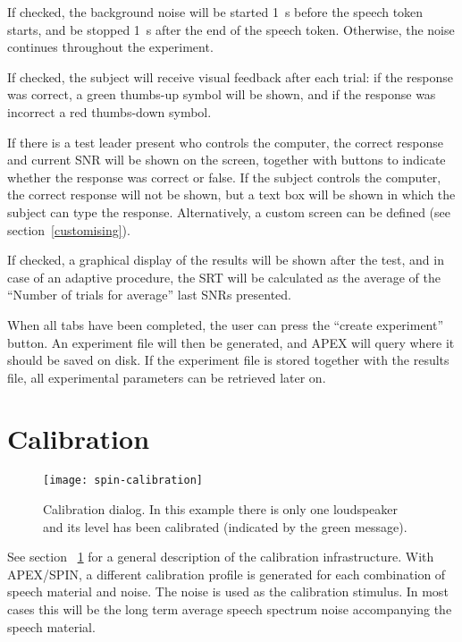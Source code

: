 \begin{description}
\itemsep1pt\parskip0pt
\item[Noise stops between trials]
If checked, the background noise will be started 1~s before the speech
token starts, and be stopped 1~s after the end of the speech token.
Otherwise, the noise continues throughout the experiment.
\item[Reinforcement]
If checked, the subject will receive visual feedback after each trial:
if the response was correct, a green thumbs-up symbol will be shown, and
if the response was incorrect a red thumbs-down symbol.
\item[Screen]
If there is a test leader present who controls the computer, the correct
response and current SNR will be shown on the screen, together with
buttons to indicate whether the response was correct or false. If the
subject controls the computer, the correct response will not be shown,
but a text box will be shown in which the subject can type the response.
Alternatively, a custom screen can be defined (see
section~\ref{customising}).
\item[Show results after test]
If checked, a graphical display of the results will be shown after the
test, and in case of an adaptive procedure, the SRT will be calculated
as the average of the ``Number of trials for average'' last SNRs
presented.
\end{description}

When all tabs have been completed, the user can press the ``create
experiment'' button. An experiment file will then be generated, and APEX
will query where it should be saved on disk. If the experiment file is stored together 
with the results file, all experimental parameters can be retrieved later on. 



\section{Calibration}
\label{sec:Calibration}

 \begin{figure} 
\texttt{[image: spin-calibration]}
\caption{Calibration dialog. In this example there is only one loudspeaker and its level has been calibrated (indicated by the green message). }
\label{fig:calibration} \end{figure} 

See section ~\ref{sec:Calibration} for a general description of the \apex calibration infrastructure. With APEX/SPIN, a different calibration
profile is generated for each combination of speech material and noise.
The noise is used as the calibration stimulus. In most cases this will
be the long term average speech spectrum noise accompanying the speech
material.

